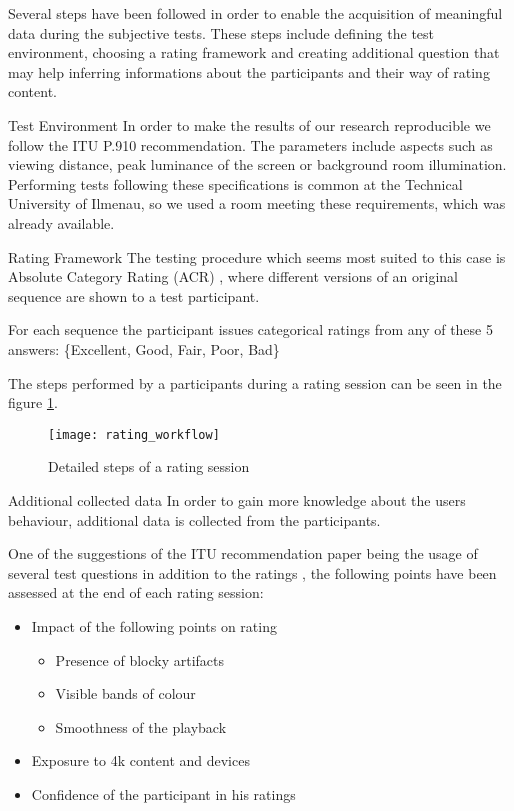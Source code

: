 Several steps have been followed in order to enable the acquisition of meaningful data during the subjective tests. These steps include defining the test environment, choosing a rating framework and creating additional question that may help inferring informations about the participants and their way of rating content.


\large{Test Environment}
In order to make the results of our research reproducible we follow the ITU P.910 \cite{rec1998p} recommendation. 
The parameters include aspects such as viewing distance, peak luminance of the screen or background room illumination.
Performing tests following these specifications is common at the Technical University of Ilmenau, so we used a room meeting these requirements, which was already available.


	
\large{Rating Framework}
The testing procedure which seems most suited to this case is Absolute Category Rating (ACR) \cite{rec1998p}, where different versions of an original sequence are shown to a test participant. 

For each sequence the participant issues categorical ratings from any of these 5 answers: \{Excellent, Good, Fair, Poor, Bad\}

The steps performed by a participants during a rating session can be seen in the figure \ref{fig:workflow:state_machine}.

\begin{figure}[htb!]
	\centering
	\texttt{[image: rating\_workflow]}
	\caption{Detailed steps of a rating session}
	\label{fig:workflow:state_machine}
\end{figure}


\large{Additional collected data}
In order to gain more knowledge about the users behaviour, additional data is collected from the participants.

One of the suggestions of the ITU recommendation paper being the usage of several test questions in addition to the ratings \cite{rec1998p}, the following points have been assessed at the end of each rating session:
\begin{itemize}
	\item Impact of the following points on rating 
	\begin{itemize}
		\item Presence of blocky artifacts
		\item Visible bands of colour
		\item Smoothness of the playback
	\end{itemize}
	\item Exposure to 4k content and devices
	\item Confidence of the participant in his ratings
\end{itemize}

